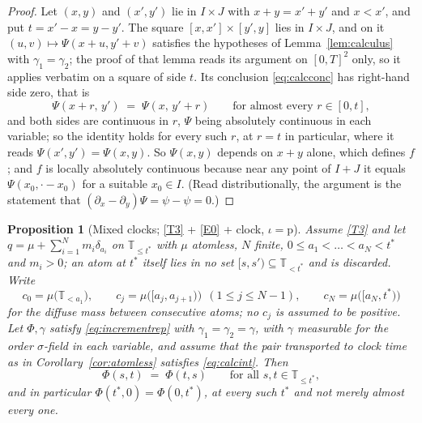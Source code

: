 \documentclass[11pt,a4paper]{article}
\theoremstyle{plain}
\newtheorem{proposition}[theorem]{Proposition}
\theoremstyle{definition}
\theoremstyle{remark}
\newcommand{\T}{\mathbb{T}}                     %
\begin{document}
\begin{proof}
  Let $(x,y)$ and $(x',y')$ lie in $I \times J$ with $x+y = x'+y'$ and $x < x'$,
  and put $t = x' - x = y - y'$.  The square $[x,x'] \times [y',y]$ lies in
  $I \times J$, and on it $(u,v) \mapsto \Psi(x+u,y'+v)$ satisfies the
  hypotheses of Lemma~\ref{lem:calculus} with $\gamma_1 = \gamma_2$; the proof of
  that lemma reads its argument on $[0,T]^2$ only, so it applies verbatim on a
  square of side $t$.  Its conclusion \eqref{eq:calcconc} has right-hand side
  zero, that is
  \[
    \Psi(x+r,\,y') \;=\; \Psi(x,\,y'+r)
    \qquad \text{for almost every } r \in [0,t] ,
  \]
  and both sides are continuous in $r$, $\Psi$ being absolutely continuous in
  each variable; so the identity holds for every such $r$, at $r = t$ in
  particular, where it reads $\Psi(x',y') = \Psi(x,y)$.  So $\Psi(x,y)$ depends
  on $x+y$ alone, which defines $f$; and $f$ is locally absolutely continuous
  because near any point of $I+J$ it equals $\Psi(x_0, \cdot - x_0)$ for a
  suitable $x_0 \in I$.  (Read distributionally, the argument is the statement
  that $(\partial_x - \partial_y)\Psi = \psi - \psi = 0$.)
\end{proof}

\begin{proposition}[Mixed clocks; \eqref{T3} + \eqref{E0} + clock, $\iota = \mathrm{p}$]
  \label{prop:mixeddual}
  Assume \eqref{T3} and let $q = \mu + \sum_{i=1}^{N} m_i \delta_{a_i}$ on
  $\T_{\leq t^*}$ with $\mu$ atomless, $N$ finite, $0 \leq a_1 < \dots < a_N < t^*$
  and $m_i > 0$; an atom at $t^*$ itself lies in no set $[s,s') \subseteq
  \T_{<t^*}$ and is discarded.  Write
  \[
    c_0 = \mu\bigl(\T_{<a_1}\bigr), \qquad
    c_j = \mu\bigl([a_j,a_{j+1})\bigr) \ \ (1 \leq j \leq N-1), \qquad
    c_N = \mu\bigl([a_N,t^*)\bigr)
  \]
  for the diffuse mass between consecutive atoms; no $c_j$ is assumed to be
  positive.  Let $\Phi,\gamma$ satisfy \eqref{eq:incrementrep} with
  $\gamma_1 = \gamma_2 = \gamma$, with $\gamma$ measurable for the order
  $\sigma$-field in each variable, and assume that the pair transported to clock
  time as in Corollary~\ref{cor:atomless} satisfies \eqref{eq:calcint}.  Then
  \[
    \Phi(s,t) \;=\; \Phi(t,s) \qquad \text{for all } s,t \in \T_{\leq t^*} ,
  \]
  and in particular $\Phi(t^*,0) = \Phi(0,t^*)$, at every such $t^*$ and not
  merely almost every one.
\end{proposition}
\end{document}
